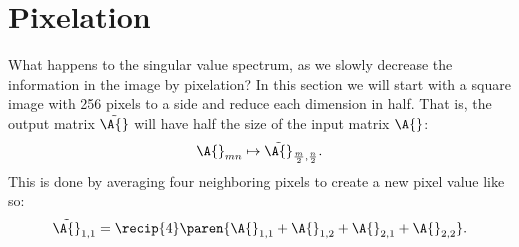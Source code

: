 \clearpage
\break

\section{Pixelation}
What happens to the singular value spectrum, as we slowly decrease the information in the image by pixelation? In this section we will start with a square image with 256 pixels to a side and reduce each dimension in half. That is, the output matrix $\tilde{\A{}}$ will have half the size of the input matrix $\A{}$:
\begin{equation}
  \A{}_{mn} \mapsto \tilde{\A{}}_{\frac{m}{2},\frac{n}{2}}.
\end{equation}
This is done by averaging four neighboring pixels to create a new pixel value like so:
\begin{equation}
  \tilde{\A{}}_{1,1} = \recip{4} \paren{ \A{}_{1,1} + \A{}_{1,2} + \A{}_{2,1} + \A{}_{2,2} }.
\end{equation}



